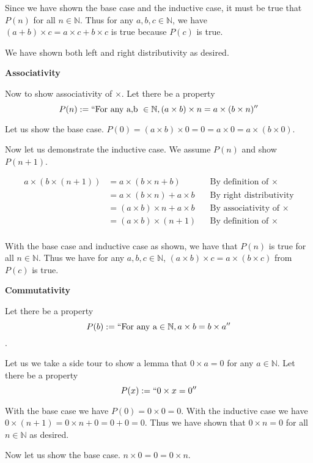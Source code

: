 \documentclass{article}
\begin{document}
\begin{enumerate}
		Since we have shown the base case and the inductive case, it must be true that $P(n)$ for all $n \in \mathbb{N}$. Thus for any $a,b,c \in \mathbb{N}$, we have $(a + b) \times c = a \times c + b \times c$ is true because $P(c)$ is true.
		
		\medskip
		We have shown both left and right distributivity as desired.
		
		\medskip
		\textbf{Associativity}
		\medskip
		
		Now to show associativity of $\times$. 
		Let there be a property $$P(n) := ``\text{For any a,b } \in \mathbb{N}, (a \times b) \times n = a \times (b \times n)''$$

		Let us show the base case. $P(0) = (a \times b) \times 0 = 0 = a \times 0 = a \times (b \times 0)$.
		
		Now let us demonstrate the inductive case. We assume $P(n)$ and show $P(n + 1)$. 
		
		\begin{align*}
			a \times (b \times (n + 1)) &= a \times (b \times n + b) && \text{By definition of $\times$}\\
			&= a \times (b \times n) + a \times b && \text{By right distributivity}\\
			&= (a \times b) \times n + a \times b && \text{By associativity of $\times$}\\
			&= (a \times b) \times (n + 1) && \text{By definition of $\times$}\\
		\end{align*}
		
		With the base case and inductive case as shown, we have that $P(n)$ is true for all $n \in \mathbb{N}$. Thus we have for any $a,b,c \in \mathbb{N}$, $(a \times b) \times c = a \times (b \times c)$ from $P(c)$ is true.
		
		\medskip
		\textbf{Commutativity}
		\medskip
		
		Let there be a property $$P(b) := ``\text{For any a} \in \mathbb{N}, a \times b = b \times a''$$.
		
		\medskip
		Let us we take a side tour to show a lemma that $0 \times a = 0$ for any $a \in \mathbb{N}$. Let there be a property $$P(x) := ``0 \times x = 0''$$
		
		With the base case we have $P(0) = 0 \times 0 = 0$. 
		With the inductive case we have $0 \times (n + 1) = 0 \times n + 0 = 0 + 0 = 0$. Thus we have shown that $0 \times n = 0$ for all $n \in \mathbb{N}$ as desired.
		
		\newpage
		Now let us show the base case. $n \times 0 = 0 = 0 \times n$.
		

\end{enumerate}
\end{document}
